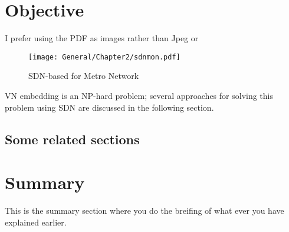 \section{Objective}
I prefer using the PDF as images rather than Jpeg or 
\begin{figure}
\centering
\texttt{[image: General/Chapter2/sdnmon.pdf]}
\caption{SDN-based for Metro Network}
\label{fig:sdnmon}
\end{figure}
VN embedding is an NP-hard problem; several approaches for solving this problem using SDN are discussed in the following section.\par
\subsection{Some related sections}

\section{Summary}
This is the summary section where you do the breifing of what ever you have explained earlier.